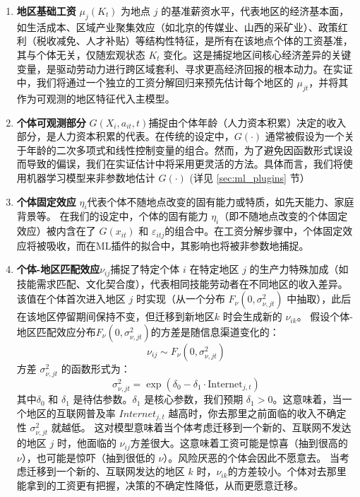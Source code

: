 \documentclass[master, final]{zufe-thesis}
\begin{document}
\begin{enumerate}
  \item \textbf{地区基础工资} $\mu_j(K_t)$ 为地点 $j$ 的基准薪资水平，代表地区的经济基本面，如生活成本、区域产业聚集效应（如北京的传媒业、山西的采矿业）、政策红利（税收减免、人才补贴）等结构性特征，是所有在该地点个体的工资基准，其与个体无关，仅随宏观状态 $K_t$ 变化。这是捕捉地区间核心经济差异的关键变量，是驱动劳动力进行跨区域套利、寻求更高经济回报的根本动力。在实证中，我们将通过一个独立的工资分解回归来预先估计每个地区的 $\mu_{jt}$，并将其作为可观测的地区特征代入主模型。

  \item \textbf{个体可观测部分} $G(X_i, a_{it}, t)$捕捉由个体年龄（人力资本积累）决定的收入部分，是人力资本积累的代表。在传统的设定中，$G(\cdot)$ 通常被假设为一个关于年龄的二次多项式和线性控制变量的组合。然而，为了避免因函数形式误设而导致的偏误，我们在实证估计中将采用更灵活的方法。具体而言，我们将使用机器学习模型来非参数地估计 $G(\cdot)$ (详见 \ref{sec:ml_plugins} 节）

  \item \textbf{个体固定效应} $\eta_i$代表个体不随地点改变的固有能力或特质，如先天能力、家庭背景等。
  在我们的设定中，个体的固有能力 $\eta_i$（即不随地点改变的个体固定效应）被内含在了 $G(x_{it})$ 和 $\varepsilon_{itj} $的组合中。在工资分解步骤中，个体固定效应将被吸收，而在ML插件的拟合中，其影响也将被非参数地捕捉。

  \item \textbf{个体-地区匹配效应}$\nu_{ij}$捕捉了特定个体 $i$ 在特定地区 $j$ 的生产力特殊加成（如技能需求匹配、文化契合度），代表相同技能劳动者在不同地区的收入差异。该值在个体首次进入地区 $j$ 时实现（从一个分布 $F_\nu(0, \sigma_{\nu,jt}^2)$ 中抽取），此后在该地区停留期间保持不变，但迁移到新地区$k$ 时会生成新的 $\nu_{ik}$。
  假设个体-地区匹配效应分布$F_\nu(0, \sigma_{\nu,jt}^2)$的方差是随信息渠道变化的：
  \begin{equation}
    \nu_{ij} \sim F_\nu(0, \sigma_{\nu,jt}^2)
  \end{equation}
  方差 $\sigma_{\nu,jt}^2$ 的函数形式为：
  \begin{equation}
    \sigma_{\nu,jt}^2 = \exp(\delta_0 - \delta_1 \cdot \text{Internet}_{j,t})
  \end{equation}
  其中$\delta_0$ 和 $\delta_1$ 是待估参数。$\delta_1$ 是核心参数，我们预期 $\delta_1 > 0$。这意味着，当一个地区的互联网普及率 $Internet_{j,t}$ 越高时，你去那里之前面临的收入不确定性 $\sigma_{\nu,jt}^2$ 就越低。
  这对模型意味着当个体考虑迁移到一个新的、互联网不发达的地区 $j$ 时，他面临的 $\nu_{ij}$方差很大。这意味着工资可能是惊喜（抽到很高的 $\nu$），也可能是惊吓（抽到很低的 $\nu$）。风险厌恶的个体会因此不愿意去。
  当考虑迁移到一个新的、互联网发达的地区 $k$ 时，$\nu_{ik}$的方差较小。个体对去那里能拿到的工资更有把握，决策的不确定性降低，从而更愿意迁移。


\end{enumerate}
\end{document}
